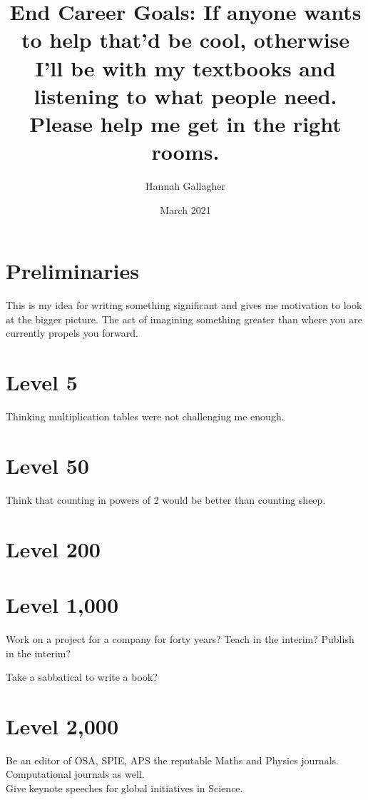 \documentclass{article}
\title{End Career Goals: If anyone wants to help that'd be cool, otherwise I'll be with my textbooks and listening to what people need. Please help me get in the right rooms.}
\author{Hannah Gallagher}
\date{March 2021}
\begin{document}
\maketitle

\section*{Preliminaries}
This is my idea for writing something significant and gives me motivation to look at the bigger picture. The act of imagining something greater than where you are currently propels you forward.  


\section*{Level 5}
Thinking multiplication tables were not challenging me enough. 


\section*{Level 50}
Think that counting in powers of 2 would be better than counting sheep. 



\section*{Level 200}





\section*{Level 1,000}
Work on a project for a company for forty years? 
Teach in the interim? 
Publish in the interim? 

Take a sabbatical to write a book? 

\section*{Level 2,000}
Be an editor of OSA, SPIE, APS the reputable Maths and Physics journals. Computational journals as well. \\ 

Give keynote speeches for global initiatives in Science. 
\end{document}
